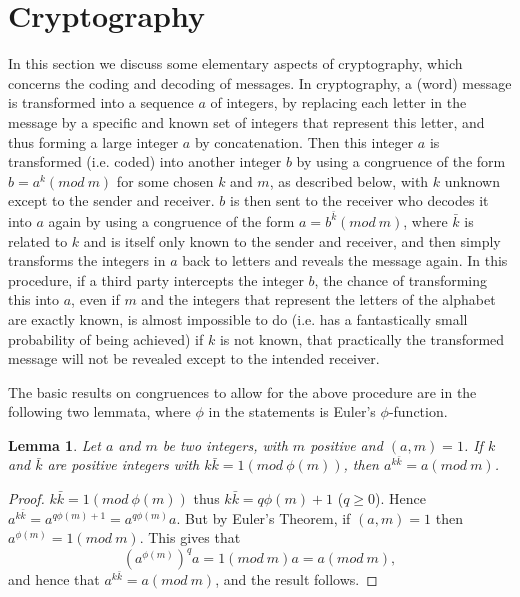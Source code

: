 \documentclass[12pt,letterpaper]{book}
\newtheorem{lemma}{Lemma}
\begin{document}
\section{Cryptography}

 In this section we discuss some elementary
aspects of cryptography, which concerns the coding and decoding of
messages. In cryptography, a (word) message is transformed into a
sequence $a$ of integers, by replacing each letter in the message by
a specific and known set of integers that represent this letter, and
thus forming a large integer $a$ by concatenation. Then this integer
$a$ is transformed (i.e. coded) into another integer $b$ by using a
congruence of the form $b=a^k(mod\ m)$ for some chosen $k$ and $m$,
as described below, with $k$ unknown except to the sender and
receiver. $b$ is then sent to the receiver who decodes it into $a$
again by using a congruence of the form $a=b^{\bar{k}}(mod\ m)$,
where $\bar{k}$ is related to $k$ and is itself only known to the
sender and receiver, and then simply transforms the integers in $a$
back to letters and reveals the message again. In this procedure, if
a third party intercepts the integer $b$, the chance of transforming
this into $a$, even if $m$ and the integers that represent the
letters of the alphabet are exactly known, is almost impossible to
do (i.e. has a fantastically small probability of being achieved) if
$k$ is not known, that practically the transformed message will not
be revealed except to the intended receiver.

The basic results on congruences to allow for the above procedure are in the following two lemmata, where $\phi$ in the
statements is Euler's $\phi$-function.

\begin{lemma}
Let $a$ and $m$ be two integers, with $m$ positive and $(a,m)=1$. If $k$ and $\bar{k}$ are positive integers
with $k\bar{k}=1(mod\ \phi(m))$, then $a^{k\bar{k}}=a(mod\ m)$.
\end{lemma}

\begin{proof}
$k\bar{k}=1(mod\ \phi(m))$ thus $k\bar{k}=q\phi(m)+1$ ($q\geq 0$). Hence $a^{k\bar{k}}=a^{q\phi(m)+1}=a^{q\phi(m)}a$.
But by Euler's Theorem, if $(a,m)=1$ then $a^{\phi(m)}=1(mod\ m)$. This gives that
\begin{equation}
(a^{\phi(m)})^qa=1(mod\ m)a=a(mod\ m),
\end{equation}
and hence that $a^{k\bar{k}}=a(mod\ m)$, and the result follows.
\end{proof}
\end{document}
